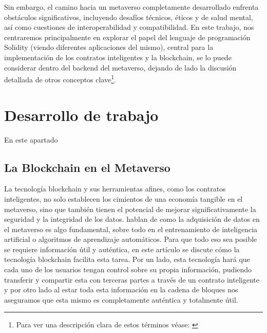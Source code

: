 \documentclass[a4paper,10pt]{article}
\begin{document}
	Sin embargo, el camino hacia un metaverso completamente desarrollado enfrenta obstáculos significativos, incluyendo desafíos técnicos, éticos y de salud mental, así como cuestiones de interoperabilidad y compatibilidad.\newline
	En este trabajo, nos centraremos principalmente en explorar el papel del lenguaje de programación Solidity (viendo diferentes aplicaciones del mismo), central para la implementación de los contratos inteligentes y la blockchain, se lo puede considerar dentro del backend del metaverso, dejando de lado la discusión detallada de otros conceptos clave\footnote{Para ver una descripción clara de estos términos véase: \textcite{grandury2022implementacion}}.
	\section{Desarrollo de trabajo}
	En este apartado 
	\subsection{La Blockchain en el Metaverso}
	La tecnología blockchain y sus herramientas afines, como los contratos inteligentes, no solo establecen los cimientos de una economía tangible en el metaverso, sino que también tienen el potencial de mejorar significativamente la seguridad y la integridad de los datos. \textcite{huynh2023blockchain} hablan de como la adquisición de datos en el metaverso es algo fundamental, sobre todo en el entrenamiento de inteligencia artificial o algoritmos de aprendizaje automáticos. Para que todo eso sea posible se requiere información útil y auténtica, en este artículo se discute cómo la tecnología blockchain facilita esta tarea. Por un lado, esta tecnología hará que cada uno de los usuarios tengan control sobre su propia información, pudiendo transferir y compartir esta con terceras partes a través de un contrato inteligente y por otro lado al estar toda esta información en la cadena de bloques nos aseguramos que esta mismo es completamente auténtica y totalmente útil.
	
\end{document}
